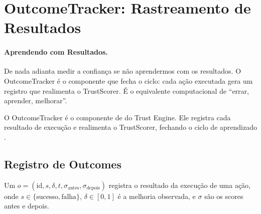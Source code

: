 \section{OutcomeTracker: Rastreamento de Resultados}
\label{sec:outcome-tracker}
\nivelintermediario

\paragraph{Aprendendo com Resultados.}
De nada adianta medir a confiança se não aprendermos com
os resultados. O OutcomeTracker é o componente que fecha o
ciclo: cada ação executada gera um registro que realimenta
o TrustScorer. É o equivalente computacional de ``errar,
aprender, melhorar''.

O OutcomeTracker é o componente de  do
Trust Engine. Ele registra cada resultado de execução e realimenta o
TrustScorer, fechando o ciclo de aprendizado \cite{opencode2026spec038}.

\subsection{Registro de Outcomes}

\begin{definicao}
Um  $o = (\text{id}, s, \delta, t,
\sigma_{\text{antes}}, \sigma_{\text{depois}})$ registra o resultado
da execução de uma ação, onde $s \in \{\text{sucesso}, \text{falha}\}$,
$\delta \in [0,1]$ é a melhoria observada, e $\sigma$ são os scores
antes e depois.
\end{definicao}

